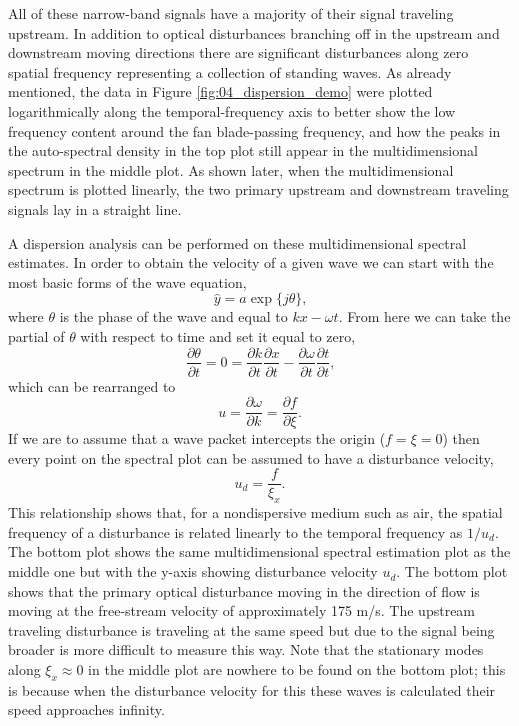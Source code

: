 All of these narrow-band signals have a majority of their signal traveling upstream.
In addition to optical disturbances branching off in the upstream and downstream moving directions there are significant disturbances along zero spatial frequency representing a collection of standing waves.
As already mentioned, the data in Figure \ref{fig:04_dispersion_demo} were plotted logarithmically along the temporal-frequency axis to better show the low frequency content around the fan blade-passing frequency, and how the peaks in the auto-spectral density in the top plot still appear in the multidimensional spectrum in the middle plot.
As shown later, when the multidimensional spectrum is plotted linearly, the two primary upstream and downstream traveling signals lay in a straight line.

A dispersion analysis can be performed on these multidimensional spectral estimates.
In order to obtain the velocity of a given wave we can start with the most basic forms of the wave equation,
\begin{equation}
  \hat{y} = a\exp\{j\theta\} \textrm{,}
\end{equation}
where $\theta$ is the phase of the wave and equal to $kx-\omega t$.
From here we can take the partial of $\theta$ with respect to time and set it equal to zero,
\begin{equation}
  \frac{\partial\theta}{\partial t} = 0 = \frac{\partial k}{\partial t}\frac{\partial x}{\partial t}-\frac{\partial \omega}{\partial t}\frac{\partial t}{\partial t} \textrm{,}
\end{equation}
which can be rearranged to
\begin{equation}
  u = \frac{\partial \omega}{\partial k} = \frac{\partial f}{\partial \xi} \textrm{.}
\end{equation}
If we are to assume that a wave packet intercepts the origin ($f=\xi=0$) then every point on the spectral plot can be assumed to have a disturbance velocity,
\begin{equation}
  u_{d} = \frac{f}{\xi_x} \textrm{.}
  \label{eqn:04_velocity_assumed}
\end{equation}
This relationship shows that, for a nondispersive medium such as air, the spatial frequency of a disturbance is related linearly to the temporal frequency as $1/u_d$.
The bottom plot shows the same multidimensional spectral estimation plot as the middle one but with the y-axis showing disturbance velocity $u_d$.
The bottom plot shows that the primary optical disturbance moving in the direction of flow is moving at the free-stream velocity of approximately 175 m/s.
The upstream traveling disturbance is traveling at the same speed but due to the signal being broader is more difficult to measure this way.
Note that the stationary modes along $\xi_x\approx0$ in the middle plot are nowhere to be found on the bottom plot; this is because when the disturbance velocity for this these waves is calculated their speed approaches infinity.


